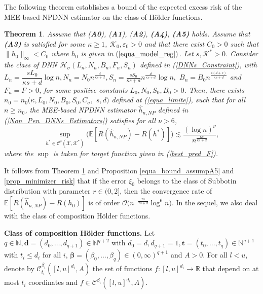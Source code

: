 \documentclass[10pt,twoside]{article}
\numberwithin{equation}{section}
\newtheorem{thm}{Theorem}[section]
\newcommand{\E}{\ensuremath{\mathbb{E}}}
\newcommand{\R}{\ensuremath{\mathbb{R}}}
\newcommand{\N}{\ensuremath{\mathbb{N}}}
\newcommand{\mk}{ { \mathcal{K}} }
\begin{document}
\noindent
The following theorem establishes a bound of the expected excess risk of the MEE-based NPDNN estimator on the class of H\"older functions. 
%
\begin{thm} \label{excess_risk_bound__expo_strong_mixing} 
Assume that (\textbf{A0}), (\textbf{A1}), (\textbf{A2}), \textbf{(A4)}, \textbf{(A5)} holds. Assume that \textbf{(A3)} is satisfied for some $\kappa \geq 1$, $\mk_0, \varepsilon_0>0$ and that there exist $C_0 > 0$ such that $\|h_0\|_{\infty} < C_0$ where $h_0$ is given in $(\ref{equa_model_reg})$.
%
Let $s, \mathcal{K}^{*} >0$.
%
Consider the class of DNN $\mathcal{H}_{\sigma}(L_n, N_n, B_n, F_n, S_n)$ defined in (\ref{DNNs_Constraint}), with
%
$L_n = \dfrac{s L_0}{\kappa s + d} \log n, N_n = N_0 n^{\frac{d}{ \kappa s + d}}, S_n = \frac{s S_0}{\kappa s + d} n^{\frac{d}{\kappa s + d}}\log n, 
$
%
 $ B_n = B_0 n^{\frac{4(d + s)}{\kappa s + d}} $ and $F_n = F>0$, 
%  
for some positive constants $L_0, N_0, S_0, B_0 > 0$. 
% 
% 
Then, there exists $n_0 = n_0(\kappa, L_0, N_0, B_0, S_0, C_\sigma,$ $ s, d) $ defined at (\ref{equa_limite}), such that for all $n \geq n_0$, the MEE-based NPDNN estimator $\widehat{h}_{n,NP}$ defined in  (\ref{Non_Pen_DNNs_Estimators}) satisfies for all $\nu>6$,
%
\begin{equation}\label{thm2_excess_risk_bound}
 \sup_{h^{*} \in \mathcal{C}^{s}(\mathcal{X}, \mathcal{K}^{*}) } \Big(  \E[R(\widehat{h}_{n,NP}) - R(h^{*})] \Big) 
\lesssim \dfrac{(\log n)^{\nu}}{ n^{\frac{\kappa s}{\kappa s + d} }},
\end{equation}
%
where the $\sup$ is taken for target function given in (\ref{best_pred_F}).   
%
\end{thm}
%
\noindent
It follows from Theorem \ref{excess_risk_bound__expo_strong_mixing} and Proposition \ref{equa_bound_assumpA5} and \ref{prop_minimizer_risk} that if the error $\xi_0$ belongs to the class of Subbotin distribution with parameter $r \in (0,2]$, then the convergence rate of $\E[R(\widehat{h}_{n,NP}) - R(h_0)]$ is of order $\mathcal{O}\big( n^{-\frac{r s}{r s + d} }  \log^6 n\big)$. 
%
In the sequel, we also deal with the class of composition H\"older functions.

\medskip

\noindent
\textbf{Class of composition H\"older functions.}\label{excess_risk_comp_Holder}
%
%
Let $q\in \N, \boldsymbol{d} = (d_0, \dots, d_{q+1})\in \N^{q + 2}$ with $d_0 = d, d_{q+1} = 1, \boldsymbol{t} = (t_0, \dots, t_q)\in \N^{q+1}$ with $t_i \leq d_i$ for all $i$, $\boldsymbol{\beta} = (\beta_0, \dots, \beta_q)\in (0,\infty)^{q+1}$ and $A>0$. 
For all $l < u$, denote by $\mathcal{C}_{t_i}^{\beta_i}([l, u]^{d_i}, A)$ the set of functions $f: [l, u]^{d_i} \rightarrow \R$ that depend on at most $t_i$ coordinates and $f \in \mathcal{C}^{\beta_i}([l, u]^{d_i}, A)$.
\end{document}
